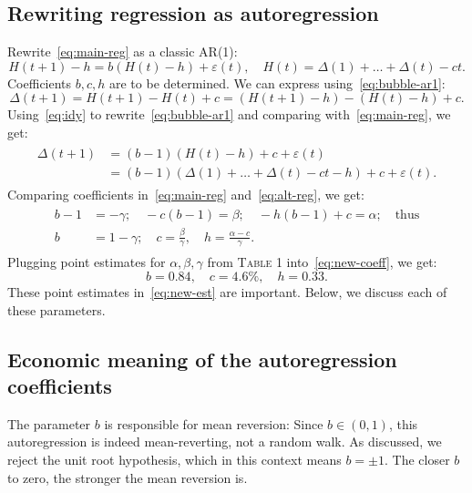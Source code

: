 \documentclass[12pt]{amsart}
\theoremstyle{definition}
\begin{document}
\subsection{Rewriting regression as autoregression}  Rewrite~\eqref{eq:main-reg} as a classic AR(1): 
\begin{equation}
\label{eq:bubble-ar1}
H(t+1) - h = b(H(t) - h) + \varepsilon(t),\quad H(t) = \Delta(1) + \ldots + \Delta(t) - ct. 
\end{equation}
Coefficients $b, c, h$ are to be determined. We can express using~\eqref{eq:bubble-ar1}:
\begin{equation}
\label{eq:idy}
\Delta(t+1) = H(t+1) - H(t) + c = (H(t+1) - h) - (H(t) - h) + c.
\end{equation}
Using~\eqref{eq:idy} to rewrite~\eqref{eq:bubble-ar1} and comparing  with~\eqref{eq:main-reg}, we get:
\begin{align}
\label{eq:alt-reg}
\begin{split}
\Delta(t+1) &= (b-1)(H(t) - h) + c + \varepsilon(t) \\ & = (b-1)(\Delta(1) + \ldots + \Delta(t) - ct - h) + c + \varepsilon(t).
\end{split}
\end{align}
Comparing coefficients in~\eqref{eq:main-reg} and~\eqref{eq:alt-reg}, we get: 
\begin{align}
\label{eq:new-coeff}
\begin{split}
b - 1 &= -\gamma;\quad -c(b - 1) = \beta;\quad -h(b-1) + c = \alpha;\quad \mbox{thus}\\
b &= 1 - \gamma;\quad c = \frac{\beta}{\gamma},\quad h = \frac{\alpha - c}{\gamma}.
\end{split}
\end{align}
Plugging point estimates for $\alpha, \beta, \gamma$ from \textsc{Table} 1 into~\eqref{eq:new-coeff}, we get:
\begin{equation}
\label{eq:new-est}
b = 0.84,\quad c = 4.6\%,\quad h = 0.33.
\end{equation}
These point estimates in~\eqref{eq:new-est} are important. Below, we discuss each of these parameters. 

\subsection{Economic meaning of the autoregression coefficients} The parameter $b$ is responsible for mean reversion: Since $b \in (0, 1)$, this  autoregression is indeed mean-reverting, not a random walk. As discussed, we reject the unit root hypothesis, which in this context means $b = \pm 1$. The closer $b$ to zero, the stronger the mean reversion is. 
\end{document}
